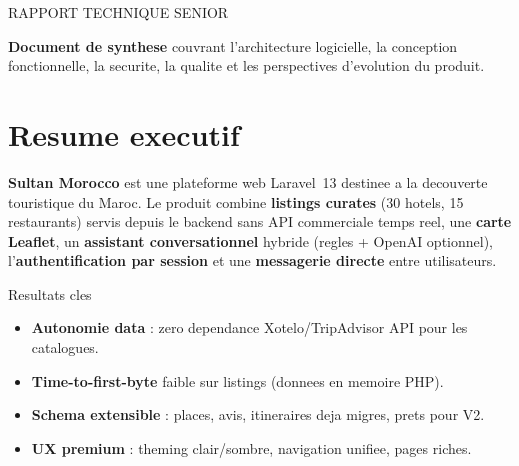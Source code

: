 \begin{titlepage}
  \centering
  \vspace*{0.5cm}
  {\small\textcolor{SultanTerracotta}{RAPPORT TECHNIQUE SENIOR}}\par
  \vspace{0.8cm}
  {\Huge\bfseries\color{SultanTeal} \reporttitle\par}
  \vspace{0.5cm}
  {\LARGE \reportsubtitle\par}
  \vspace{1.5cm}
  \vspace{1.2cm}
  {\large\reportstack\par}
  \vspace{0.5cm}
  {\large \reportversion\par}
  \vfill
  \begin{minipage}{0.85\textwidth}
    \centering
    \textbf{Document de synthese} couvrant l'architecture logicielle, la conception fonctionnelle, la securite, la qualite et les perspectives d'evolution du produit.
  \end{minipage}
  \vspace{1.2cm}
\end{titlepage}

\chapter*{Resume executif}

\textbf{Sultan Morocco} est une plateforme web Laravel~13 destinee a la decouverte touristique du Maroc. Le produit combine \textbf{listings curates} (30 hotels, 15 restaurants) servis depuis le backend sans API commerciale temps reel, une \textbf{carte Leaflet}, un \textbf{assistant conversationnel} hybride (regles + OpenAI optionnel), l'\textbf{authentification par session} et une \textbf{messagerie directe} entre utilisateurs.

\begin{keybox}{Resultats cles}
\begin{itemize}[noitemsep]
  \item \textbf{Autonomie data} : zero dependance Xotelo/TripAdvisor API pour les catalogues.
  \item \textbf{Time-to-first-byte} faible sur listings (donnees en memoire PHP).
  \item \textbf{Schema extensible} : places, avis, itineraires deja migres, prets pour V2.
  \item \textbf{UX premium} : theming clair/sombre, navigation unifiee, pages riches.
\end{itemize}
\end{keybox}

